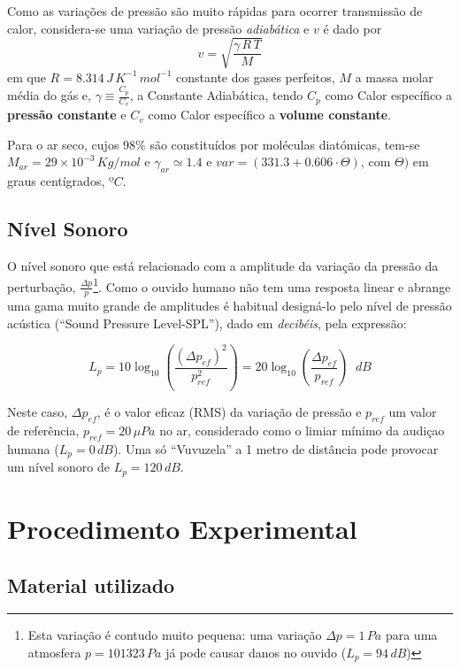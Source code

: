 \documentclass[a4paper,12pt]{article}      %
\begin{document}
Como as variações de pressão são muito rápidas para ocorrer transmissão de calor, considera-se uma variação de pressão \emph{adiabática} e $v$ é dado por 
\begin{equation}
	\label{eq:veloc2}
	v = \sqrt{\frac{\gamma\,R\,T}{M}}
\end{equation}
em que $R=8.314\,J\,K^{-1}\,mol^{-1}$ constante dos gases perfeitos, $M$ a massa molar média do gás e, $\gamma \equiv \frac{C_p}{C_v}$, a Constante Adiabática, tendo $C_p$ como Calor específico a {\bf pressão constante} e $C_v$ como Calor específico a {\bf volume constante}.

Para o ar seco, cujos $98\%$ são constituídos por moléculas diatómicas, tem-se $M_{ar}=29\times 10^{-3}\,Kg/mol$ e $\gamma_{ar} \simeq1.4$ e $v{ar} = (331.3 + 0.606 \cdot \Theta)$, com $\Theta)$  em graus centígrados, $ºC$.

\subsection{\sf Nível Sonoro}
O nível sonoro que está relacionado com a amplitude da variação da pressão  da perturbação, $\frac{\Delta p}{p}$\footnote{Esta variação é contudo muito pequena: uma variação $\Delta p=1\,Pa$ para uma atmosfera $p= 101323\,Pa$ já pode causar danos no ouvido ($L_p = 94\,dB$)}. Como o ouvido humano 
não tem uma resposta linear e abrange uma gama muito grande de amplitudes é habitual designá-lo pelo nível de pressão acústica (“Sound Pressure Level-SPL”), dado em \emph{decibéis}, pela expressão:

\begin{equation}
	\label{eq:n_sonoro}
	L_p = 10 \log_{10} \left( \frac{(\Delta p_{ef})^2}{p_{ref}^2} \right) = 20 \log_{10} \left( \frac{\Delta p_{ef}}{p_{ref}} \right)  \; \; dB
\end{equation}

Neste caso, $\Delta p_{ef}$, é o valor eficaz (RMS) da variação de pressão e $p_{ref}$ um valor de referência,  $p_{ref}=20\, \mu  Pa$ no ar, considerado como o limiar mínimo da audiçao humana ($L_p = 0\,dB$). Uma só “Vuvuzela” a 1 metro de distância pode provocar um nível sonoro de $L_p = 120\,dB$.


\newpage
\section{\sf Procedimento Experimental}
\subsection{\sf Material utilizado}
\end{document}
